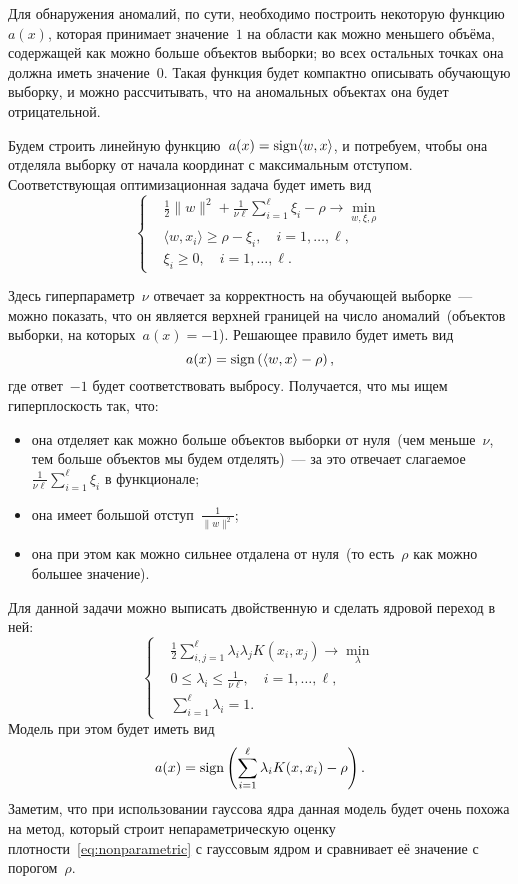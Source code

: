 \documentclass[12pt,fleqn]{article}
\begin{document}
Для обнаружения аномалий, по сути, необходимо построить некоторую функцию~$a(x)$,
которая принимает значение~$1$ на области как можно меньшего объёма,
содержащей как можно больше объектов выборки; во всех остальных точках она
должна иметь значение~$0$.
Такая функция будет компактно описывать обучающую выборку,
и можно рассчитывать, что на аномальных объектах она будет отрицательной.

Будем строить линейную функцию~$a(x) = \mathop{\rm sign}\limits \langle w, x \rangle$, и потребуем,
чтобы она отделяла выборку от начала координат с максимальным отступом.
Соответствующая оптимизационная задача будет иметь вид~\cite{scholkopf99oneclass}
\[
    \left\{
        \begin{aligned}
            & \frac{1}{2} \|w\|^2
            +
            \frac{1}{\nu \ell} \sum_{i = 1}^{\ell} \xi_i
            -
            \rho
            \to \min_{w, \xi, \rho} \\
            & \langle w, x_i \rangle
            \geq
            \rho - \xi_i,
            \quad i = 1, \dots, \ell, \\
            & \xi_i \geq 0, \quad i = 1, \dots, \ell.
        \end{aligned}
    \right.
\]

Здесь гиперпараметр~$\nu$ отвечает за корректность на обучающей выборке~---
можно показать, что он является верхней границей на число аномалий~(объектов выборки,
на которых~$a(x) = -1$).
Решающее правило будет иметь вид
\[
    a(x)
    =
    \mathop{\rm sign}\limits\left(
        \langle w, x \rangle
        -
        \rho
    \right),
\]
где ответ~$-1$ будет соответствовать выбросу.
Получается, что мы ищем гиперплоскость так, что:
\begin{itemize}
    \item она отделяет как можно больше объектов выборки от нуля~(чем меньше~$\nu$, тем больше объектов мы будем отделять)~---
        за это отвечает слагаемое~$\frac{1}{\nu \ell} \sum_{i = 1}^{\ell} \xi_i$ в функционале;
    \item она имеет большой отступ~$\frac{1}{\|w\|^2}$;
    \item она при этом как можно сильнее отдалена от нуля~(то есть~$\rho$ как можно большее значение).
\end{itemize}

Для данной задачи можно выписать двойственную и сделать ядровой переход в ней:
\[
    \left\{
        \begin{aligned}
            & \frac{1}{2} \sum_{i, j = 1}^{\ell}
                \lambda_i \lambda_j K(x_i, x_j)
            \to \min_{\lambda} \\
            & 0 \leq \lambda_i \leq \frac{1}{\nu \ell},
            \quad i = 1, \dots, \ell, \\
            & \sum_{i = 1}^{\ell} \lambda_i = 1.
        \end{aligned}
    \right.
\]
Модель при этом будет иметь вид
\[
    a(x)
    =
    \mathop{\rm sign}\limits\left(
        \sum_{i = 1}^{\ell}
            \lambda_i K(x, x_i)
        -
        \rho
    \right).
\]
Заметим, что при использовании гауссова ядра данная модель будет очень похожа
на метод, который строит непараметрическую оценку плотности~\eqref{eq:nonparametric} с гауссовым ядром
и сравнивает её значение с порогом~$\rho$.
\end{document}
